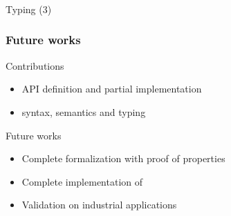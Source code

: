 \begin{frame}
\frametitle{\FKotac}
\begin{block}{Typing (3)}
\centering
\end{block}
\end{frame}

\begin{frame}
\frametitle{Future works}
\begin{block}{Contributions}
\begin{itemize}
\item \Kotac{} API definition and partial implementation
\item \FKotac{} syntax, semantics and typing
\end{itemize}
\end{block}
\begin{block}{Future works}
\begin{itemize}
\item Complete formalization with proof of properties
\item Complete implementation of \Kotac{}
\item Validation on industrial applications
\end{itemize}
\end{block}
\end{frame}


